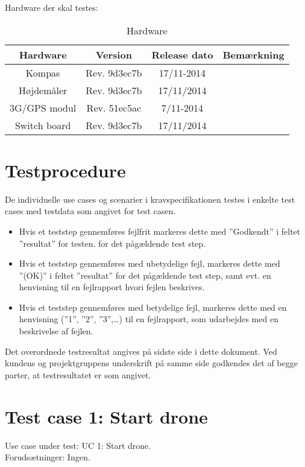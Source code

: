 Hardware der skal testes:
\begin{table}[H]
	\centering
		\begin{tabular}{|c|c|c|c|}
			\hline
			Hardware & Version & Release dato & Bemærkning \\ \hline
			Kompas 			& Rev. 9d3ec7b & 17/11-2014 &  \\ \hline			
			Højdemåler 		& Rev. 9d3ec7b & 17/11/2014 &  \\ \hline
			3G/GPS modul 	& Rev. 51ec5ac & 7/11-2014 &  \\ \hline
			Switch board 	& Rev. 9d3ec7b & 17/11/2014 &  \\ \hline
		\end{tabular}
	\caption{Hardware}
\end{table}


\section*{Testprocedure}
De individuelle use cases og scenarier i kravspecifikationen testes i enkelte test cases med testdata som angivet for test casen. 

\begin{itemize}
	\item Hvis et teststep gennemføres fejlfrit markeres dette med ”Godkendt” i feltet ”resultat” for testen. for det pågældende test step.

	\item Hvis et teststep gennemføres med ubetydelige fejl, markeres dette med ”(OK)” i feltet ”resultat” for det pågældende test step, samt evt. en henvisning til en fejlrapport hvori fejlen beskrives.
	
	\item Hvis et teststep gennemføres med betydelige fejl, markeres dette med en henvisning (”1”, ”2”, ”3”,…) til en fejlrapport, som udarbejdes med en beskrivelse af fejlen.
	
\end{itemize}
Det overordnede testresultat angives på sidste side i dette dokument. Ved kundens og projektgruppens underskrift på samme side godkendes det af begge parter, at testresultatet er som angivet.

\newpage

\section{Test case 1: Start drone}
Use case under test: UC 1: Start drone.\\
Forudsætninger:	Ingen.


